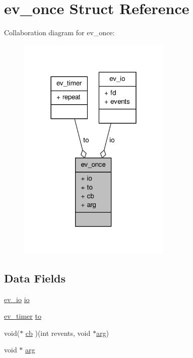 \hypertarget{structev__once}{\section{ev\-\_\-once \-Struct \-Reference}
\label{structev__once}
}


\-Collaboration diagram for ev\-\_\-once\-:
\nopagebreak
\begin{figure}[H]
\begin{center}
\leavevmode
\includegraphics[width=206pt]{structev__once__coll__graph}
\end{center}
\end{figure}
\subsection*{\-Data \-Fields}
\begin{DoxyCompactItemize}
\item 
\hyperlink{structev__io}{ev\-\_\-io} \hyperlink{structev__once_a0a60f96152fbb4f3d01c7ef3e4a3d856}{io}
\item 
\hyperlink{structev__timer}{ev\-\_\-timer} \hyperlink{structev__once_a07c6e8b8c00f07a7dcad174eb9b0a9e8}{to}
\item 
void($\ast$ \hyperlink{structev__once_ade289570a63e50d9a874027c1f34f0ff}{cb} )(int revents, void $\ast$\hyperlink{structev__once_a9ce2ec4812a92cb6ab39f6e81e9173a9}{arg})
\item 
void $\ast$ \hyperlink{structev__once_a9ce2ec4812a92cb6ab39f6e81e9173a9}{arg}
\end{DoxyCompactItemize}


